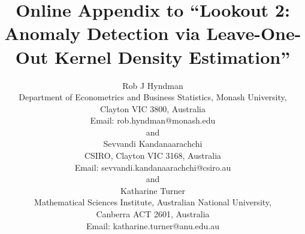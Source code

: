 \documentclass[12pt]{article}
\theoremstyle{plain}%
\theoremstyle{definition}
\def\spacingset#1{\renewcommand{\baselinestretch}%
{#1}\small\normalsize}
\begin{document}
\spacingset{1}

\title{\bf Online Appendix to ``Lookout 2: Anomaly Detection via Leave-One-Out Kernel Density Estimation''}
\author{
  Rob J Hyndman\\
  Department of Econometrics and Business Statistics, Monash University,\\
  Clayton VIC 3800, Australia\\
  Email: rob.hyndman@monash.edu\\
  and\\
  Sevvandi Kandanaarachchi\\
  CSIRO, Clayton VIC 3168, Australia\\
  Email: sevvandi.kandanaarachchi@csiro.au\\
  and\\
  Katharine Turner\\
  Mathematical Sciences Institute, Australian National University,\\
  Canberra ACT 2601, Australia\\
  Email: katharine.turner@anu.edu.au
}
\maketitle

\spacingset{1.8}





\end{document}
